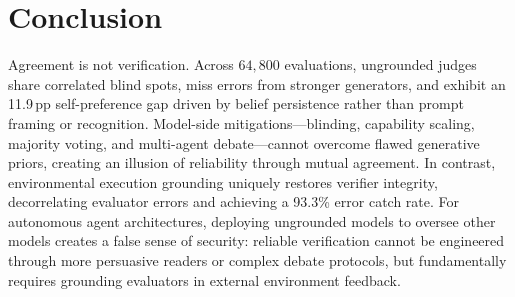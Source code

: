 \section{Conclusion}
\label{sec:conclusion}

Agreement is not verification. Across $64{,}800$ evaluations, ungrounded judges share correlated blind spots, miss errors from stronger generators, and exhibit an 11.9\,pp self-preference gap driven by belief persistence rather than prompt framing or recognition. Model-side mitigations—blinding, capability scaling, majority voting, and multi-agent debate—cannot overcome flawed generative priors, creating an illusion of reliability through mutual agreement. In contrast, environmental execution grounding uniquely restores verifier integrity, decorrelating evaluator errors and achieving a 93.3\% error catch rate. For autonomous agent architectures, deploying ungrounded models to oversee other models creates a false sense of security: reliable verification cannot be engineered through more persuasive readers or complex debate protocols, but fundamentally requires grounding evaluators in external environment feedback.
